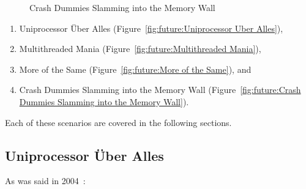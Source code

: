 \begin{figure}[tb]
\begin{center}
\end{center}
\caption{Crash Dummies Slamming into the Memory Wall}
\end{figure}

\begin{enumerate}
\item	Uniprocessor \"Uber Alles
	(Figure~\ref{fig:future:Uniprocessor Uber Alles}),
\item	Multithreaded Mania
	(Figure~\ref{fig:future:Multithreaded Mania}),
\item	More of the Same
	(Figure~\ref{fig:future:More of the Same}), and
\item	Crash Dummies Slamming into the Memory Wall
	(Figure~\ref{fig:future:Crash Dummies Slamming into the Memory Wall}).
\end{enumerate}

Each of these scenarios are covered in the following sections.

\subsection{Uniprocessor \"Uber Alles}
\label{sec:future:Uniprocessor Uber Alles}

As was said in 2004~\cite{PaulEdwardMcKenneyPhD}:

